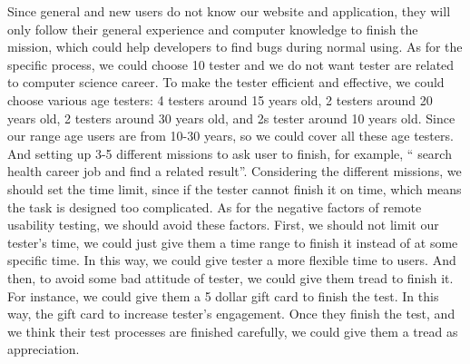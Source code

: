 \documentclass[letterpaper,10pt, draftclsnofoot,onecolumn]{IEEEtran}
\begin{document}
{{Since general and new users do not know our website and application, they will only follow their general experience and computer knowledge to finish the mission, which could help developers to find bugs during normal using. As for the specific process, we could choose 10 tester and we do not want tester are related to computer science career. To make the tester efficient and effective, we could choose various age testers: 4 testers around 15 years old, 2 testers around 20 years old, 2 testers around 30 years old, and 2s tester around 10 years old. Since our range age users are from 10-30 years, so we could cover all these age testers. And setting up 3-5 different missions to ask user to finish, for example, “ search health career job and find a related result”. Considering the different missions, we should set the time limit, since  if the tester cannot finish it on time, which means the task is designed too complicated. As for the negative factors of remote usability testing, we should avoid these factors. First, we should not limit our tester’s time, we could just give them a time range to finish it instead of at some specific time. In this way, we could give tester a more flexible time to users. And then, to avoid some bad attitude of tester, we could give them tread to finish it. For instance, we could give them a 5 dollar gift card to finish the test. In this way, the gift card to increase tester’s engagement. Once they finish the test, and we think their test processes are finished carefully, we could give them a tread as appreciation.




{\noindent\color{black}

}

}}
\end{document}
